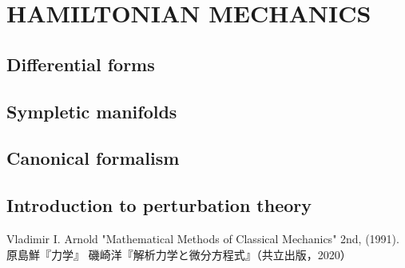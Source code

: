 \documentclass[uplatex,dvipdfmx]{jsreport}
\begin{document}
\part{HAMILTONIAN MECHANICS}

\chapter{Differential forms}

\chapter{Sympletic manifolds}

\chapter{Canonical formalism}

\chapter{Introduction to perturbation theory}

\begin{thebibliography}{99}
    Vladimir I. Arnold "Mathematical Methods of Classical Mechanics" 2nd, (1991).
    原島鮮『力学』
    磯崎洋『解析力学と微分方程式』（共立出版，2020）
\end{thebibliography}
\end{document}

